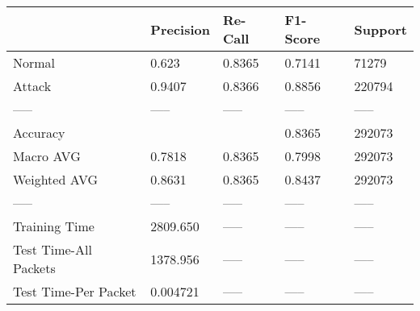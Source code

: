 \begin{tabular}{lllll}
\toprule
{} & Precision & Re-Call & F1-Score & Support \\
\midrule
Normal                &     0.623 &  0.8365 &   0.7141 &   71279 \\
Attack                &    0.9407 &  0.8366 &   0.8856 &  220794 \\
-----                 &     ----- &   ----- &    ----- &   ----- \\
Accuracy              &           &         &   0.8365 &  292073 \\
Macro AVG             &    0.7818 &  0.8365 &   0.7998 &  292073 \\
Weighted AVG          &    0.8631 &  0.8365 &   0.8437 &  292073 \\
-----                 &     ----- &   ----- &    ----- &   ----- \\
Training Time         &  2809.650 &   ----- &    ----- &   ----- \\
Test Time-All Packets &  1378.956 &   ----- &    ----- &   ----- \\
Test Time-Per Packet  &  0.004721 &   ----- &    ----- &   ----- \\
\bottomrule
\end{tabular}

